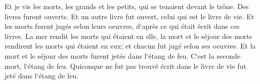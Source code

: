 \verse Et je vis les morts, les grands et les petits, qui se tenaient devant le trône. Des livres furent ouverts. Et un autre livre fut ouvert, celui qui est le livre de vie. Et les morts furent jugés selon leurs oeuvres, d`après ce qui était écrit dans ces livres. 
\verse La mer rendit les morts qui étaient en elle, la mort et le séjour des morts rendirent les morts qui étaient en eux; et chacun fut jugé selon ses oeuvres. 
\verse Et la mort et le séjour des morts furent jetés dans l`étang de feu. C`est la seconde mort, l`étang de feu. 
\verse Quiconque ne fut pas trouvé écrit dans le livre de vie fut jeté dans l`étang de feu. 

